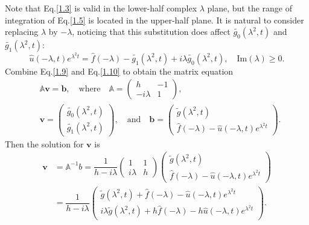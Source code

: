 \documentclass[12pt]{article}
\numberwithin{equation}{section}
\begin{document}
Note that Eq.\eqref{1.3} is valid in the lower-half complex $\lambda$ plane, but the range of integration of Eq.\eqref{1.5} is located in the upper-half plane. It is natural to consider replacing $\lambda$ by $-\lambda$, noticing that this substitution does affect $\tilde{g_0}(\lambda^2,t)$ and $\tilde{g_1}(\lambda^2,t)$:
\begin{equation}\label{1.10}
    \hat{u}(-\lambda,t)e^{\lambda^2 t}=\hat{f}(-\lambda)-\tilde{g_1}(\lambda^2,t)+i\lambda\tilde{g_0}(\lambda^2,t), \quad \text{Im}(\lambda)\geqslant 0.
\end{equation}
Combine Eq.\eqref{1.9} and Eq.\eqref{1.10} to obtain the matrix equation
\begin{align*}
    &\mathbb{A}\boldsymbol{v}=\boldsymbol{b}, \quad \text{where} \quad
    \mathbb{A}= \begin{pmatrix} h & -1\\ -i\lambda & 1 \end{pmatrix},\\
    &\boldsymbol{v}= \begin{pmatrix} \tilde{g_0}(\lambda^2,t) \\ \tilde{g_1}(\lambda^2,t) \end{pmatrix}, \quad \text{and} \quad 
    \boldsymbol{b}=\begin{pmatrix} \tilde{g}(\lambda^2,t) \\ \hat{f}(-\lambda)-\hat{u}(-\lambda,t)e^{\lambda^2 t} \end{pmatrix}.
\end{align*}
Then the solution for $\boldsymbol{v}$ is
\begin{equation*}
    \begin{split}
    \boldsymbol{v}&=\mathbb{A}^{-1}b=\dfrac{1}{h-i\lambda}\begin{pmatrix} 1 & 1 \\ i\lambda & h \end{pmatrix} \begin{pmatrix} \tilde{g}(\lambda^2,t) \\ \hat{f}(-\lambda)-\hat{u}(-\lambda,t)e^{\lambda^2 t} \end{pmatrix}\\
    &=\dfrac{1}{h-i\lambda} \begin{pmatrix} \tilde{g}(\lambda^2,t)+\hat{f}(-\lambda)-\hat{u}(-\lambda,t)e^{\lambda^2 t}\\ i\lambda \tilde{g}(\lambda^2,t)+h\hat{f}(-\lambda)-h\hat{u}(-\lambda,t)e^{\lambda^2 t} \end{pmatrix}.
    \end{split}
\end{equation*}
\end{document}
